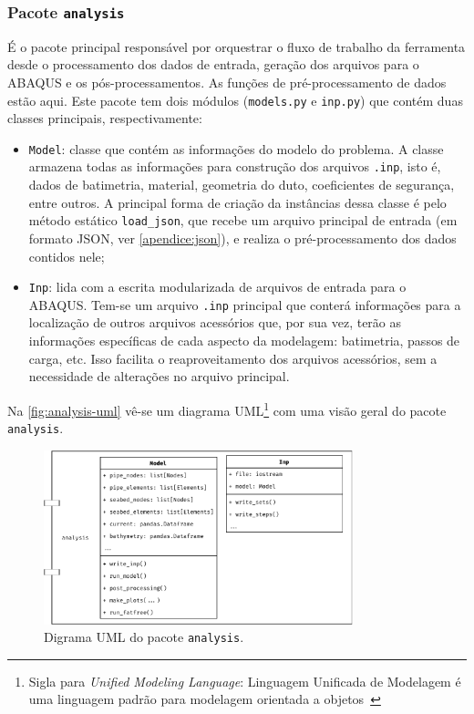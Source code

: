 \subsubsection{Pacote \texttt{analysis}}


É o pacote principal responsável por orquestrar o fluxo de trabalho da ferramenta desde o processamento dos dados de entrada, geração dos arquivos para o ABAQUS e os pós-processamentos.
As funções de pré-processamento de dados estão aqui.
Este pacote tem dois módulos (\texttt{models.py} e \texttt{inp.py}) que contém duas classes principais, respectivamente:

\begin{itemize}
    \item \texttt{Model}: classe que contém as informações do modelo do problema.
    A classe armazena todas as informações para construção dos arquivos \texttt{.inp}, isto é, dados de batimetria, material, geometria do duto, coeficientes de segurança, entre outros.
    A principal forma de criação da instâncias dessa classe é pelo método estático \texttt{load\_json}, que recebe um arquivo principal de entrada (em formato JSON, ver \autoref{apendice:json}), e realiza o pré-processamento dos dados contidos nele;

    \item \texttt{Inp}: lida com a escrita modularizada de arquivos de entrada  para o ABAQUS. Tem-se um arquivo \texttt{.inp} principal que conterá informações para a localização de outros arquivos acessórios que, por sua vez, terão as informações específicas de cada aspecto da modelagem: batimetria, passos de carga, etc. Isso facilita o reaproveitamento dos arquivos acessórios, sem a necessidade de alterações no arquivo principal.
\end{itemize}

Na \autoref{fig:analysis-uml} vê-se um diagrama UML\footnote{Sigla para \textit{Unified Modeling Language}: Linguagem Unificada de Modelagem é uma linguagem padrão para modelagem orientada a objetos~\cite{infoescolauml}} com uma visão geral do pacote \texttt{analysis}.

\begin{figure}[!ht]
    \centering
    \caption{Digrama UML do pacote \texttt{analysis}.}\label{fig:analysis-uml}
    \includegraphics[width=0.8\textwidth]{imagens/analysis-uml}
\end{figure}


